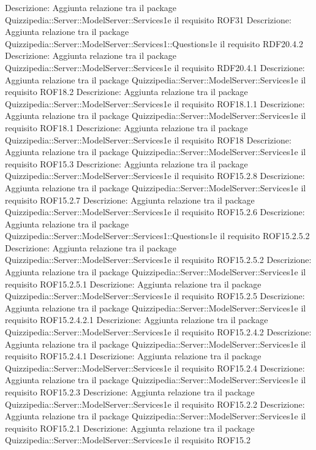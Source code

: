 Descrizione: Aggiunta relazione tra il package Quizzipedia::Server::ModelServer::Services1e il requisito ROF31 
Descrizione: Aggiunta relazione tra il package Quizzipedia::Server::ModelServer::Services1::Questions1e il requisito RDF20.4.2 
Descrizione: Aggiunta relazione tra il package Quizzipedia::Server::ModelServer::Services1e il requisito RDF20.4.1 
Descrizione: Aggiunta relazione tra il package Quizzipedia::Server::ModelServer::Services1e il requisito ROF18.2 
Descrizione: Aggiunta relazione tra il package Quizzipedia::Server::ModelServer::Services1e il requisito ROF18.1.1 
Descrizione: Aggiunta relazione tra il package Quizzipedia::Server::ModelServer::Services1e il requisito ROF18.1 
Descrizione: Aggiunta relazione tra il package Quizzipedia::Server::ModelServer::Services1e il requisito ROF18 
Descrizione: Aggiunta relazione tra il package Quizzipedia::Server::ModelServer::Services1e il requisito ROF15.3 
Descrizione: Aggiunta relazione tra il package Quizzipedia::Server::ModelServer::Services1e il requisito ROF15.2.8 
Descrizione: Aggiunta relazione tra il package Quizzipedia::Server::ModelServer::Services1e il requisito ROF15.2.7 
Descrizione: Aggiunta relazione tra il package Quizzipedia::Server::ModelServer::Services1e il requisito ROF15.2.6 
Descrizione: Aggiunta relazione tra il package Quizzipedia::Server::ModelServer::Services1::Questions1e il requisito ROF15.2.5.2 
Descrizione: Aggiunta relazione tra il package Quizzipedia::Server::ModelServer::Services1e il requisito ROF15.2.5.2 
Descrizione: Aggiunta relazione tra il package Quizzipedia::Server::ModelServer::Services1e il requisito ROF15.2.5.1 
Descrizione: Aggiunta relazione tra il package Quizzipedia::Server::ModelServer::Services1e il requisito ROF15.2.5 
Descrizione: Aggiunta relazione tra il package Quizzipedia::Server::ModelServer::Services1e il requisito ROF15.2.4.2.1 
Descrizione: Aggiunta relazione tra il package Quizzipedia::Server::ModelServer::Services1e il requisito ROF15.2.4.2 
Descrizione: Aggiunta relazione tra il package Quizzipedia::Server::ModelServer::Services1e il requisito ROF15.2.4.1 
Descrizione: Aggiunta relazione tra il package Quizzipedia::Server::ModelServer::Services1e il requisito ROF15.2.4 
Descrizione: Aggiunta relazione tra il package Quizzipedia::Server::ModelServer::Services1e il requisito ROF15.2.3 
Descrizione: Aggiunta relazione tra il package Quizzipedia::Server::ModelServer::Services1e il requisito ROF15.2.2 
Descrizione: Aggiunta relazione tra il package Quizzipedia::Server::ModelServer::Services1e il requisito ROF15.2.1 
Descrizione: Aggiunta relazione tra il package Quizzipedia::Server::ModelServer::Services1e il requisito ROF15.2 

